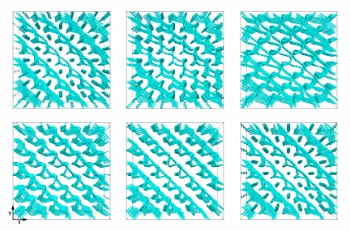 \documentclass[8.5pt,twoside,twocolumn]{article}
\begin{document}
\begin{figure}[htpb]
\includegraphics[width=0.32\textwidth]{disc-365k_run914.png}
\includegraphics[width=0.32\textwidth]{disc-367k_run914.png}
\includegraphics[width=0.32\textwidth]{disc-375k_run914.png}\\
\includegraphics[width=0.32\textwidth]{disc-380k_run914.png}
\includegraphics[width=0.32\textwidth]{disc-384k_run914.png}
\includegraphics[width=0.32\textwidth]{disc-389k_run914.png}

\end{figure}
\end{document}
